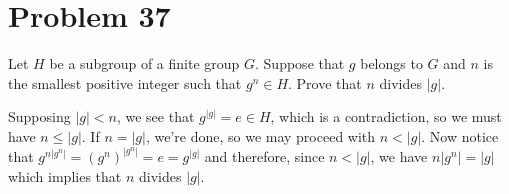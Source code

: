 \documentclass[12pt]{article}
\begin{document}
\section*{Problem 37}

Let $H$ be a subgroup of a finite group $G$.  Suppose that $g$ belongs to $G$
and $n$ is the smallest positive integer such that $g^n\in H$.
Prove that $n$ divides $|g|$.

Supposing $|g|<n$, we see that $g^{|g|}=e\in H$, which is a contradiction,
so we must have $n\leq |g|$.  If $n=|g|$, we're done, so we may proceed
with $n<|g|$.  Now notice that
$g^{n|g^n|}=(g^n)^{|g^n|}=e=g^{|g|}$ and therefore,
since $n<|g|$, we have $n|g^n|=|g|$ which implies that $n$ divides $|g|$.
\end{document}
